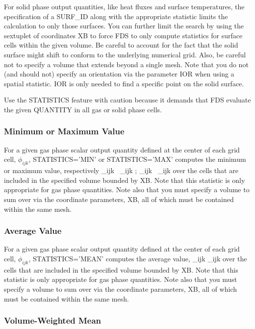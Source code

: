 \documentclass[11pt]{book}
\begin{document}
For solid phase output quantities, like heat fluxes and surface temperatures, the specification of a {\ct SURF\_ID} along with the appropriate statistic limits the calculation to only those surfaces. You can further limit the search by using the sextuplet of coordinates {\ct XB} to force FDS to only compute statistics for surface cells within the given volume. Be careful to account for the fact that the solid surface might shift to conform to the underlying numerical grid. Also, be careful not to specify a volume that extends beyond a single mesh. Note that you do not (and should not) specify an orientation via the parameter {\ct IOR} when using a spatial statistic. {\ct IOR} is only needed to find a specific point on the solid surface.

Use the {\ct STATISTICS} feature with caution because it demands that FDS evaluate the given {\ct QUANTITY} in all gas or solid phase cells.


\subsubsection{Minimum or Maximum Value}

For a given gas phase scalar output quantity defined at the center of each grid cell, $\phi_{ijk}$, {\ct STATISTICS='MIN'} or {\ct STATISTICS='MAX'} computes the minimum or maximum value, respectively
\be
   \min_{ijk} \, \phi_{ijk} \quad ; \quad  \max_{ijk} \, \phi_{ijk}
\ee
over the cells that are included in the specified volume bounded by {\ct XB}. Note that this statistic is only appropriate for gas phase quantities. Note also that you must specify a volume to sum over via the coordinate parameters, {\ct XB}, all of which must be contained within the same mesh.


\subsubsection{Average Value}

For a given gas phase scalar output quantity defined at the center of each grid cell, $\phi_{ijk}$, {\ct STATISTICS='MEAN'} computes the average value,
\be {} \; \sum_{ijk} \phi_{ijk}  \ee
over the cells that are included in the specified volume bounded by {\ct XB}. Note that this
statistic is only appropriate for gas phase quantities. Note also that you must specify a volume to sum over via the
coordinate parameters, {\ct XB}, all of which must be contained within the same mesh.

\subsubsection{Volume-Weighted Mean}
\end{document}
